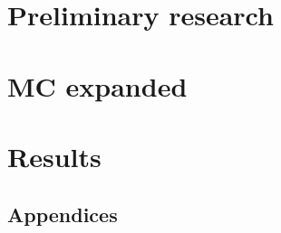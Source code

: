 \part{Preliminary research}
   

   

\newpage
\part{MC expanded}\label{part:mcexpanded}
   

   
   

   


\part{Results}
   

   
   


\begin{appendices}
   \part{Appendices}
   
   
\end{appendices}


